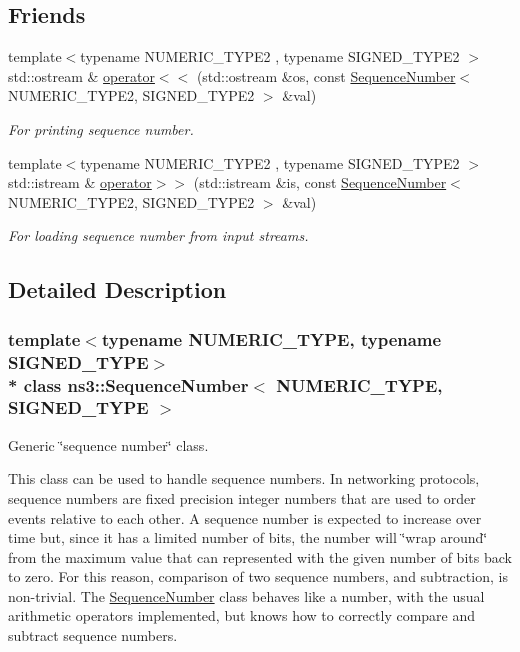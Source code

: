 \subsection*{Friends}
\begin{DoxyCompactItemize}
\item 
{\footnotesize template$<$typename N\+U\+M\+E\+R\+I\+C\+\_\+\+T\+Y\+P\+E2 , typename S\+I\+G\+N\+E\+D\+\_\+\+T\+Y\+P\+E2 $>$ }\\std\+::ostream \& \hyperlink{classns3_1_1SequenceNumber_ac08058cba0bb60e7e40e2a64f472f114}{operator$<$$<$} (std\+::ostream \&os, const \hyperlink{classns3_1_1SequenceNumber}{Sequence\+Number}$<$ N\+U\+M\+E\+R\+I\+C\+\_\+\+T\+Y\+P\+E2, S\+I\+G\+N\+E\+D\+\_\+\+T\+Y\+P\+E2 $>$ \&val)
\begin{DoxyCompactList}\small\item\em For printing sequence number. \end{DoxyCompactList}\item 
{\footnotesize template$<$typename N\+U\+M\+E\+R\+I\+C\+\_\+\+T\+Y\+P\+E2 , typename S\+I\+G\+N\+E\+D\+\_\+\+T\+Y\+P\+E2 $>$ }\\std\+::istream \& \hyperlink{classns3_1_1SequenceNumber_a4b5fa6ec20f24da386a9dddd38a0c0f8}{operator$>$$>$} (std\+::istream \&is, const \hyperlink{classns3_1_1SequenceNumber}{Sequence\+Number}$<$ N\+U\+M\+E\+R\+I\+C\+\_\+\+T\+Y\+P\+E2, S\+I\+G\+N\+E\+D\+\_\+\+T\+Y\+P\+E2 $>$ \&val)
\begin{DoxyCompactList}\small\item\em For loading sequence number from input streams. \end{DoxyCompactList}\end{DoxyCompactItemize}


\subsection{Detailed Description}
\subsubsection*{template$<$typename N\+U\+M\+E\+R\+I\+C\+\_\+\+T\+Y\+PE, typename S\+I\+G\+N\+E\+D\+\_\+\+T\+Y\+PE$>$\\*
class ns3\+::\+Sequence\+Number$<$ N\+U\+M\+E\+R\+I\+C\+\_\+\+T\+Y\+P\+E, S\+I\+G\+N\+E\+D\+\_\+\+T\+Y\+P\+E $>$}

Generic \char`\"{}sequence number\char`\"{} class. 

This class can be used to handle sequence numbers. In networking protocols, sequence numbers are fixed precision integer numbers that are used to order events relative to each other. A sequence number is expected to increase over time but, since it has a limited number of bits, the number will \char`\"{}wrap around\char`\"{} from the maximum value that can represented with the given number of bits back to zero. For this reason, comparison of two sequence numbers, and subtraction, is non-\/trivial. The \hyperlink{classns3_1_1SequenceNumber}{Sequence\+Number} class behaves like a number, with the usual arithmetic operators implemented, but knows how to correctly compare and subtract sequence numbers.

